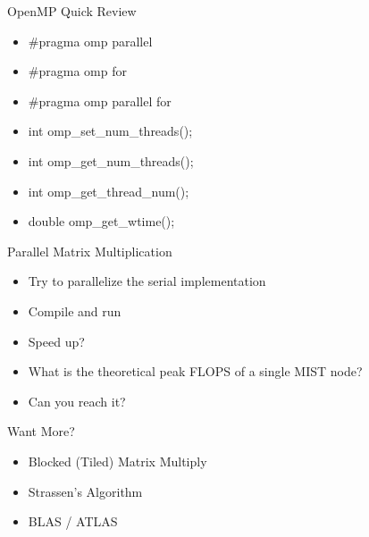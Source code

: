 \documentclass[xcolor=dvipsnames]{beamer}
\begin{document}
	
	\begin{frame}{OpenMP Quick Review}
		\begin{itemize}
			\item \#pragma omp parallel
			\item \#pragma omp for
			\item \#pragma omp parallel for
			\item int omp\_set\_num\_threads();
			\item int omp\_get\_num\_threads();
			\item int omp\_get\_thread\_num();
			\item double omp\_get\_wtime();
		\end{itemize}
	\end{frame}
	
	
	\begin{frame}{Parallel Matrix Multiplication}
		\begin{itemize}
			\item Try to parallelize the serial implementation
			\item Compile and run
			\item Speed up?

			\item What is the theoretical peak FLOPS of a single MIST node?

			\item Can you reach it?
		\end{itemize}
	\end{frame}
	

	\begin{frame}{Want More?}
		\begin{itemize}
			\item Blocked (Tiled) Matrix Multiply
			\item Strassen's Algorithm
			\item BLAS / ATLAS
		\end{itemize}
	\end{frame}
\end{document}
